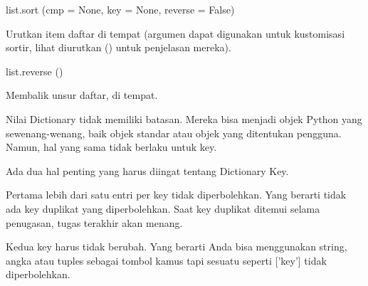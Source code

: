\noindent 
list.sort (cmp = None, key = None, reverse = False) \par
\noindent 
Urutkan item daftar di tempat (argumen dapat digunakan untuk kustomisasi sortir, lihat diurutkan () untuk penjelasan mereka). \par
\vspace{12pt}
\noindent 
list.reverse () \par
\noindent 
Membalik unsur daftar, di tempat. \par
\vspace{12pt}
Nilai Dictionary tidak memiliki batasan. Mereka bisa menjadi objek Python yang sewenang-wenang, baik objek standar atau objek yang ditentukan pengguna. Namun, hal yang sama tidak berlaku untuk key. \par
\vspace{12pt}
Ada dua hal penting yang harus diingat tentang Dictionary Key. \par
\vspace{12pt}
Pertama lebih dari satu entri per key tidak diperbolehkan. Yang berarti tidak ada key duplikat yang diperbolehkan. Saat key duplikat ditemui selama penugasan, tugas terakhir akan menang. \par
\vspace{12pt}
Kedua key harus tidak berubah. Yang berarti Anda bisa menggunakan string, angka atau tuples sebagai tombol kamus tapi sesuatu seperti ['key'] tidak diperbolehkan. \par
